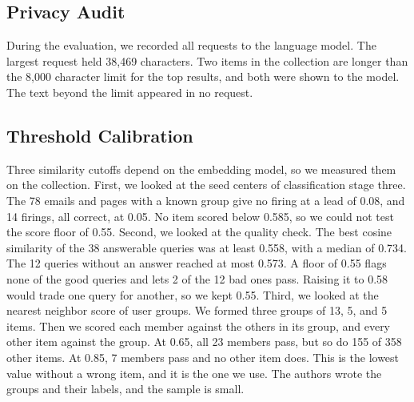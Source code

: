 \documentclass[conference]{IEEEtran}
\begin{document}
\subsection{Privacy Audit}
During the evaluation, we recorded all requests to the language model. The largest request held 38,469 characters. Two items in the collection are longer than the 8,000 character limit for the top results, and both were shown to the model. The text beyond the limit appeared in no request.

\subsection{Threshold Calibration}
Three similarity cutoffs depend on the embedding model, so we measured them on the collection. First, we looked at the seed centers of classification stage three. The 78 emails and pages with a known group give no firing at a lead of 0.08, and 14 firings, all correct, at 0.05. No item scored below 0.585, so we could not test the score floor of 0.55. Second, we looked at the quality check. The best cosine similarity of the 38 answerable queries was at least 0.558, with a median of 0.734. The 12 queries without an answer reached at most 0.573. A floor of 0.55 flags none of the good queries and lets 2 of the 12 bad ones pass. Raising it to 0.58 would trade one query for another, so we kept 0.55. Third, we looked at the nearest neighbor score of user groups. We formed three groups of 13, 5, and 5 items. Then we scored each member against the others in its group, and every other item against the group. At 0.65, all 23 members pass, but so do 155 of 358 other items. At 0.85, 7 members pass and no other item does. This is the lowest value without a wrong item, and it is the one we use. The authors wrote the groups and their labels, and the sample is small.

\end{document}
